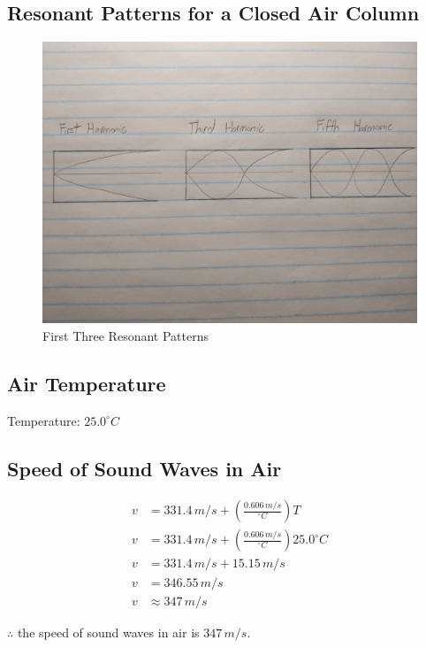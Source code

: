 \documentclass[12pt]{article}
\numberwithin{equation}{section}
\begin{document}
\subsection{Resonant Patterns for a Closed Air Column}

\begin{figure}[H]
	\centering
	\includegraphics[scale=0.11]{data-collection/resonant-patterns.jpg}
	\caption{First Three Resonant Patterns}
	\label{fig:patterns}
\end{figure}

\subsection{Air Temperature}

Temperature: $25.0^{\circ}C$

\subsection{Speed of Sound Waves in Air}

\begin{align}
v&=331.4\,m/s+\left(\frac{0.606\,m/s}{{}^{\circ}C}\right)T\\
v&=331.4\,m/s+\left(\frac{0.606\,m/s}{{}^{\circ}C}\right)25.0^{\circ}C\\
v&=331.4\,m/s+15.15\,m/s\\
v&=346.55\,m/s\\
v&\approx347\,m/s
\end{align}

$\therefore$ the speed of sound waves in air is $347\,m/s$.
\end{document}
